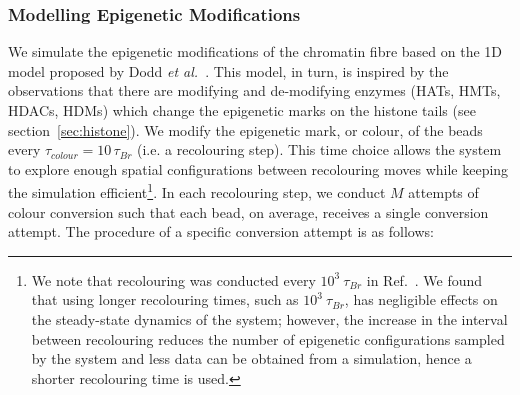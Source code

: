 \documentclass[12pt]{article}
\newcommand{\etal}{\emph{et al.}}
\begin{document}
\subsubsection{Modelling Epigenetic Modifications}
\label{sec:recolouring}
We simulate the epigenetic modifications of the chromatin fibre based on the 1D model proposed by Dodd \etal~\cite{dodd2007}. This model, in turn, is inspired by the observations that there are modifying and de-modifying enzymes (HATs, HMTs, HDACs, HDMs) which change the epigenetic marks on the histone tails (see section~\ref{sec:histone}). We modify the epigenetic mark, or colour, of the beads every $\tau_{colour} = 10\,\tau_{Br}$ (i.e. a recolouring step). This time choice allows the system to explore enough spatial configurations between recolouring moves while keeping the simulation efficient\footnote{We note that recolouring was conducted every $10^3~\tau_{Br}$ in Ref.~\cite{michieletto2016}. We found that using longer recolouring times, such as $10^3~\tau_{Br}$, has negligible effects on the steady-state dynamics of the system; however, the increase in the interval between recolouring reduces the number of epigenetic configurations sampled by the system and less data can be obtained from a simulation, hence a shorter recolouring time is used.}. In each recolouring step, we conduct $M$ attempts of colour conversion such that each bead, on average, receives a single conversion attempt. The procedure of a specific conversion attempt is as follows: 
\end{document}
